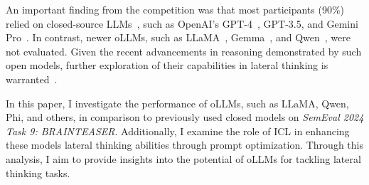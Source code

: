 An important finding from the competition was that most participants (90\%) relied on closed-source \acp{LLM}~\cite{jiangSemEval2024Task92024}, such as OpenAI's \acs{GPT}-4~\cite{openaiGPT4TechnicalReport2024}, \acs{GPT}-3.5, and Gemini Pro~\cite{teamGeminiFamilyHighly2024}. In contrast, newer \acp{oLLM}, such as \ac{LLaMA}~\cite{grattafioriLlama3Herd2024}, \ac{Gemma}~\cite{teamGemma2Improving2024}, and \ac{Qwen}~\cite{qwenQwen25TechnicalReport2025}, were not evaluated. Given the recent advancements in reasoning demonstrated by such open models, further exploration of their capabilities in lateral thinking is warranted~\cite{OpenLLMLeaderboard, grattafioriLlama3Herd2024, teamGemma2Improving2024, qwenQwen25TechnicalReport2025}.

In this paper, I investigate the performance of \acp{oLLM}, such as \ac{LLaMA}, \ac{Qwen}, \ac{Phi}, and others, in comparison to previously used closed models on \textit{SemEval 2024 Task 9: BRAINTEASER}. Additionally, I examine the role of \ac{ICL} in enhancing these models lateral thinking abilities through prompt optimization. Through this analysis, I aim to provide insights into the potential of \acp{oLLM} for tackling lateral thinking tasks.
